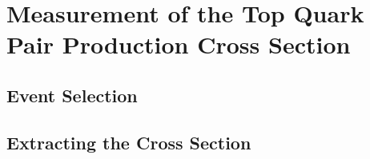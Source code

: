 \chapter{Measurement of the Top Quark Pair Production Cross Section}

\section{Event Selection}

\section{Extracting the Cross Section}
	
\subsection{}

